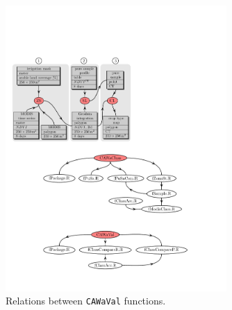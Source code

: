 \begin{figure}[p]
\centering\includegraphics[width=0.75\textwidth]{figures/CAWaVal_functions.pdf}
\caption{Relations between \texttt{CAWaVal} functions.}\label{fig:cawaval-functions}
\end{figure}

